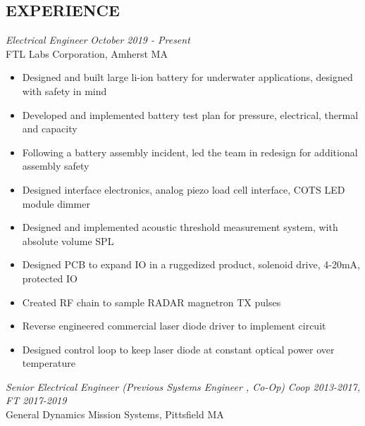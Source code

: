 \documentclass[line,mmmargin]{res}
\begin{document}
\begin{resume}
\section{EXPERIENCE} 
{\sl Electrical Engineer} \hfill {\sl October 2019 - Present}\\
	FTL Labs Corporation, Amherst MA
	\begin{itemize}  \itemsep -2pt %
		\item Designed and built large li-ion battery for
			underwater applications, designed with safety in mind
		\item Developed and implemented battery test plan
			for pressure, electrical, thermal and capacity
		\item Following a battery assembly incident, led the 
			team in redesign for additional assembly safety
		\item Designed interface electronics, analog piezo
			load cell interface, COTS LED module dimmer
        \item Designed and implemented acoustic threshold measurement system, 
            with absolute volume SPL
		\item Designed PCB to expand IO in a ruggedized product,
			solenoid drive, 4-20mA, protected IO
		\item Created RF chain to sample RADAR magnetron TX pulses
		\item Reverse engineered commercial laser diode driver to
			implement circuit
		\item Designed control loop to keep laser diode at constant
			optical power over temperature
	\end{itemize}
	\vspace{-10pt}
{\sl Senior Electrical Engineer (Previous Systems Engineer , Co-Op)} \hfill
{\sl Coop 2013-2017, FT 2017-2019}\\
	General Dynamics Mission Systems, Pittsfield MA
	\begin{itemize}  \itemsep -2pt %

\end{itemize}
\end{resume}
\end{document}
